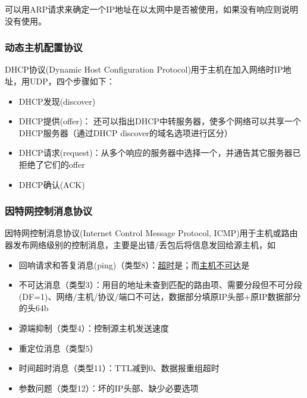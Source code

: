 可以用ARP请求来确定一个IP地址在以太网中是否被使用，如果没有响应则说明没有使用。

\subsubsection{动态主机配置协议}
DHCP协议(Dynamic Host Configuration Protocol)用于主机在加入网络时IP地址，用UDP，四个步骤如下：
\begin{itemize}
	\item DHCP发现(discover)
	\item DHCP提供(offer)： 还可以指出DHCP中转服务器，使多个网络可以共享一个DHCP服务器（通过DHCP discover的域名选项进行区分）
	\item DHCP请求(request)：从多个响应的服务器中选择一个，并通告其它服务器已拒绝了它们的offer
	\item DHCP确认(ACK)
\end{itemize}

\subsubsection{因特网控制消息协议}
因特网控制消息协议(Internet Control Message Protocol, ICMP)用于主机或路由器发布网络级别的控制消息，主要是出错/丢包后将信息发回给源主机，如
\begin{itemize}
	\item 回响请求和答复消息(ping)（类型8）：\underline{超时}是；而\underline{主机不可达}是
	\item 不可达消息（类型3）：用目的地址未查到匹配的路由项、需要分段但不可分段(DF=1)、网络/主机/协议/端口不可达，数据部分填原IP头部+原IP数据部分的头64b
	\item 源端抑制（类型4）：控制源主机发送速度
	\item 重定位消息（类型5）
	\item 时间超时消息（类型11）：TTL减到0、数据报重组超时
	\item 参数问题（类型12）：坏的IP头部、缺少必要选项
\end{itemize}

